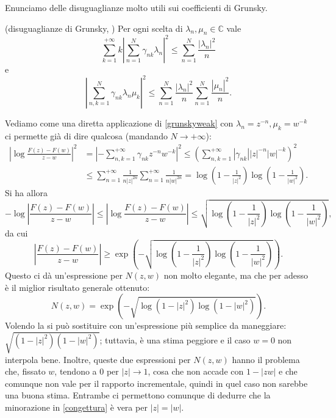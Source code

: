 Enunciamo delle disuguaglianze molto utili sui coefficienti di Grunsky.
\begin{thm}
  (disuguaglianze di Grunsky, \cite[Chapter 4.3, Inequalities (10) and (12)]{D}) Per ogni scelta di $\lambda_n, \mu_n \in \mathbb{C}$ vale
  \begin{equation}\label{grunskystrong}
    \sum_{k=1}^{+\infty} k\left|\sum_{n=1}^N\gamma_{nk}\lambda_n\right|^2 \le \sum_{n=1}^N \frac{|\lambda_n|^2}{n}
  \end{equation}
  e
  \begin{equation}\label{grunskyweak}
    \left|\sum_{n,k=1}^N \gamma_{nk}\lambda_n\mu_k\right|^2 \le \sum_{n=1}^N \frac{|\lambda_n|^2}{n}\sum_{n=1}^N \frac{|\mu_n|^2}{n}.
  \end{equation}
\end{thm}
Vediamo come una diretta applicazione di \eqref{grunskyweak} con $\lambda_n=z^{-n},\mu_k=w^{-k}$ ci permette già di dire qualcosa (mandando $N \longrightarrow +\infty$):
\begin{align*}
  \left|\log{\frac{F(z)-F(w)}{z-w}}\right|^2 &=\left|-\sum_{n,k=1}^{+\infty} \gamma_{nk}z^{-n}w^{-k}\right|^2 \le \left(\sum_{n,k=1}^{+\infty} |\gamma_{nk}||z|^{-n}|w|^{-k}\right)^2 \\
  &\le \sum_{n=1}^{+\infty} \frac{1}{n|z|^{2n}}\sum_{n=1}^{+\infty} \frac{1}{n|w|^{2n}}=\log\left(1-\frac{1}{|z|^2}\right)\log\left(1-\frac{1}{|w|^2}\right).
\end{align*}
Si ha allora
$$-\log{\left|\frac{F(z)-F(w)}{z-w}\right|} \le \left|\log{\frac{F(z)-F(w)}{z-w}}\right| \le \sqrt{\log\left(1-\frac{1}{|z|^2}\right)\log\left(1-\frac{1}{|w|^2}\right)},$$
da cui
$$\left|\frac{F(z)-F(w)}{z-w}\right| \ge \exp\left(-\sqrt{\log\left(1-\frac{1}{|z|^2}\right)\log\left(1-\frac{1}{|w|^2}\right)}\right).$$
Questo ci dà un'espressione per $N(z,w)$ non molto elegante, ma che per adesso è il miglior risultato generale ottenuto:
\begin{equation} \label{best}
  N(z,w)=\exp\left(-\sqrt{\log\left(1-|z|^2\right)\log\left(1-|w|^2\right)}\right).
\end{equation}
Volendo la si può sostituire con un'espressione più semplice da maneggiare: $\sqrt{(1-|z|^2)(1-|w|^2)}$; tuttavia, è una stima peggiore e il caso $w=0$ non interpola bene. Inoltre, queste due espressioni per $N(z,w)$ hanno il problema che, fissato $w$, tendono a $0$ per $|z| \longrightarrow 1$, cosa che non accade con $1-|zw|$ e che comunque non vale per il rapporto incrementale, quindi in quel caso non sarebbe una buona stima. Entrambe ci permettono comunque di dedurre che la minorazione in \eqref{congettura} è vera per $|z|=|w|$.

